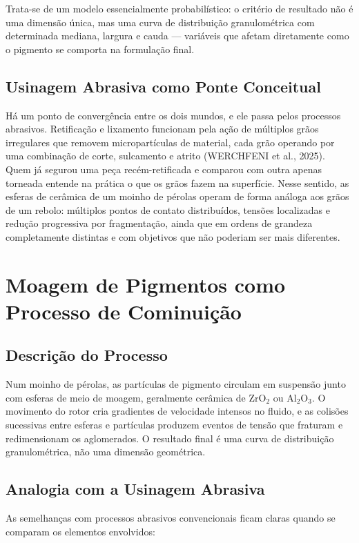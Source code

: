 \documentclass[
  12pt,
  a4paper,
  oneside,
  brazil,
  chapter=TITLE
]{article}
\newcommand{\secbreak}{\clearpage}
\let\oldsection\section
\renewcommand{\section}{\secbreak\oldsection}
\begin{document}
Trata-se de um modelo essencialmente probabilístico: o critério de resultado
não é uma dimensão única, mas uma curva de distribuição granulométrica com
determinada mediana, largura e cauda --- variáveis que afetam diretamente
como o pigmento se comporta na formulação final.

\subsection{Usinagem Abrasiva como Ponte Conceitual}

Há um ponto de convergência entre os dois mundos, e ele passa pelos processos
abrasivos. Retificação e lixamento funcionam pela ação de múltiplos grãos
irregulares que removem micropartículas de material, cada grão operando por
uma combinação de corte, sulcamento e atrito (WERCHFENI et al., 2025). Quem já
segurou uma peça recém-retificada e comparou com outra apenas torneada entende
na prática o que os grãos fazem na superfície. Nesse sentido, as esferas de
cerâmica de um moinho de pérolas operam de forma análoga aos grãos de um
rebolo: múltiplos pontos de contato distribuídos, tensões localizadas e
redução progressiva por fragmentação, ainda que em ordens de grandeza
completamente distintas e com objetivos que não poderiam ser mais diferentes.

\section{Moagem de Pigmentos como Processo de Cominuição}

\subsection{Descrição do Processo}

Num moinho de pérolas, as partículas de pigmento circulam em suspensão junto
com esferas de meio de moagem, geralmente cerâmica de ZrO$_2$ ou
Al$_2$O$_3$. O movimento do rotor cria gradientes de velocidade intensos no
fluido, e as colisões sucessivas entre esferas e partículas produzem eventos
de tensão que fraturam e redimensionam os aglomerados. O resultado final é uma
curva de distribuição granulométrica, não uma dimensão geométrica.

\subsection{Analogia com a Usinagem Abrasiva}

As semelhanças com processos abrasivos convencionais ficam claras quando se
comparam os elementos envolvidos:
\end{document}
